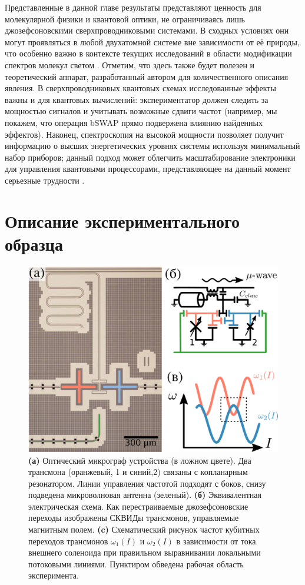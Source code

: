 \documentclass[14pt, a4paper]{extreport}
\numberwithin{equation}{section}
\begin{document}
Представленные в данной главе результаты представляют ценность для молекулярной физики и квантовой оптики, не ограничиваясь лишь джозефсоновскими сверхпроводниковыми системами. В сходных условиях они могут проявляться в любой двухатомной системе вне зависимости от её природы, что особенно важно в контексте текущих исследований в области модификации спектров молекул светом \cite{hertzog2019strong}. Отметим, что здесь также будет полезен и теоретический аппарат, разработанный автором для количественного описания явления. В сверхпроводниковых квантовых схемах исследованные эффекты важны и для квантовых вычислений: экспериментатор должен следить за мощностью сигналов и учитывать возможные сдвиги частот (например, мы покажем, что операция bSWAP \cite{poletto2012entanglement} прямо подвержена влиянию найденных эффектов). Наконец, спектроскопия на высокой мощности позволяет получит информацию о высших энергетических уровнях системы используя минимальный набор приборов; данный подход может облегчить масштабирование электроники для управления квантовыми процессорами, представляющее на данный момент серьезные трудности \cite{hornibrook2015cryogenic}.

\section{Описание экспериментального образца}


\begin{figure}
	\centering
	\includegraphics[width=0.7\linewidth]{Pictures/experiment_2}
	\caption{\textbf{(а)} Оптический микрограф устройства (в ложном цвете). Два трансмона (оранжевый, 1 и синий,2) связаны с  копланарным резонатором. Линии управления частотой подходят с боков, снизу подведена микроволновая антенна (зеленый). \textbf{(б)} Эквивалентная электрическая схема. Как перестраиваемые джозефсоновские переходы изображены СКВИДы трансмонов, управляемые магнитным полем. \textbf{(c)} Схематический рисунок частот кубитных переходов трансмонов $\omega_1 (I)$ и $\omega_2 (I)$ в зависимости от тока внешнего соленоида при правильном выравнивании локальными потоковыми линиями. Пунктиром обведена рабочая область эксперимента.}
	\label{fig:experiment2}
\end{figure}
\end{document}
